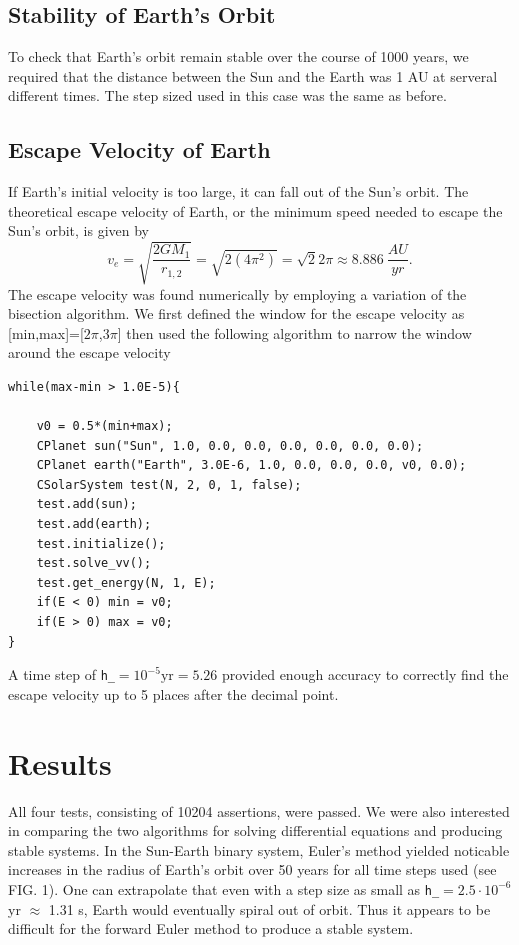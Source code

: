 \documentclass[prb,aps,twocolumn,showpacs,10pt]{revtex4-1}
\begin{document}
\subsection{Stability of Earth's Orbit}
To check that Earth's orbit remain stable over the course of 1000 years, we required that the distance between the Sun and the Earth was 1 AU at serveral different times. The step sized used in this case was the same as before.

\subsection{Escape Velocity of Earth}
If Earth's initial velocity is too large, it can fall out of the Sun's orbit. The theoretical escape velocity of Earth, or the minimum speed needed to escape the Sun's orbit, is given by 
\begin{equation}
v_e = \sqrt{\frac{2GM_1}{r_{1,2}}} = \sqrt{2(4\pi^2)} = \sqrt{2}2\pi \approx 8.886\  \frac{AU}{yr}.
\end{equation}
The escape velocity was found numerically by employing a variation of the bisection algorithm. We first defined the window for the escape velocity as [min,max]=[$2\pi$,$3\pi$] then used the following algorithm to narrow the window around the escape velocity
\begin{lstlisting}
while(max-min > 1.0E-5){

	v0 = 0.5*(min+max);
	CPlanet sun("Sun", 1.0, 0.0, 0.0, 0.0, 0.0, 0.0, 0.0);
	CPlanet earth("Earth", 3.0E-6, 1.0, 0.0, 0.0, 0.0, v0, 0.0);
	CSolarSystem test(N, 2, 0, 1, false);
	test.add(sun);
	test.add(earth);
	test.initialize();
	test.solve_vv();
	test.get_energy(N, 1, E);
	if(E < 0) min = v0;
	if(E > 0) max = v0;
}
\end{lstlisting}
A time step of \texttt{h\_}$=10^{-5} \text{yr}=5.26$ provided enough accuracy to correctly find the escape velocity up to 5 places after the decimal point. 

\section{Results}
All four tests, consisting of 10204 assertions, were passed. We were also interested in comparing the two algorithms for solving differential equations and producing stable systems. In the Sun-Earth binary system, Euler's method yielded noticable increases in the radius of Earth's orbit over 50 years for all time steps used (see FIG. 1). One can extrapolate that even with a step size as small as \texttt{h\_}$=2.5\cdot10^{-6}$ yr $\approx$ 1.31 s, Earth would eventually spiral out of orbit. Thus it appears to be difficult for the forward Euler method to produce a stable system. \\
\end{document}
